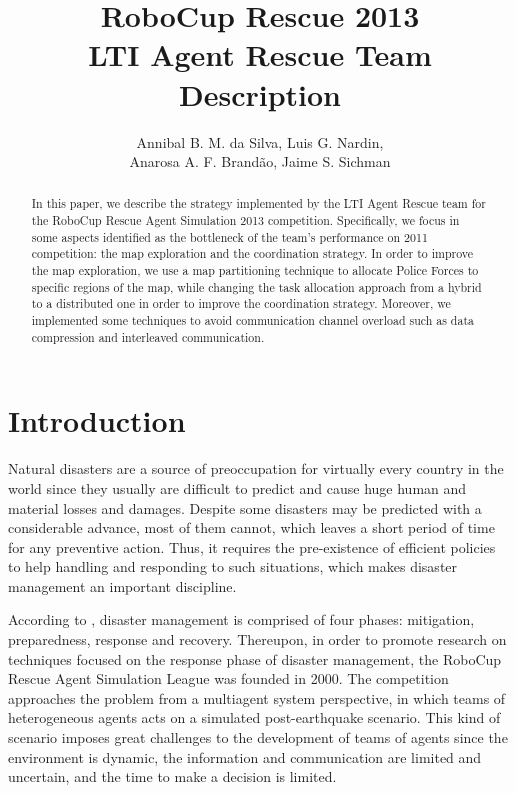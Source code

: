 \documentclass{llncs}
\begin{document}
\title{RoboCup Rescue 2013\\
       LTI Agent Rescue Team Description}
\author{Annibal B. M. da Silva, Luis G. Nardin,\\
        Anarosa A. F. Brand{\~a}o, Jaime S. Sichman}
\maketitle
\begin{abstract}
In this paper, we describe the strategy implemented by the LTI Agent Rescue team for the RoboCup Rescue Agent Simulation 2013 competition. Specifically, we focus in some aspects identified as the bottleneck of the team's performance on 2011 competition: the map exploration and the coordination strategy. In order to improve the map exploration, we use a map partitioning technique to allocate Police Forces to specific regions of the map, while changing the task allocation approach from a hybrid to a distributed one in order to improve the coordination strategy. Moreover, we implemented some techniques to avoid communication channel overload such as data compression and interleaved communication.
\end{abstract}
\section{Introduction}
\label{sec:introduction}
Natural disasters are a source of preoccupation for virtually every country in the world since they usually are difficult to predict and cause huge human and material losses and damages. Despite some disasters may be predicted with a considerable advance, most of them cannot, which leaves a short period of time for any preventive action. Thus, it requires the pre-existence of efficient policies to help handling and responding to such situations, which makes disaster management an important discipline. 

According to \cite{blanchardEtAl2007}, disaster management is comprised of four phases: mitigation, preparedness, response and recovery. Thereupon, in order to promote research on techniques focused on the response phase of disaster management, the RoboCup Rescue Agent Simulation League \cite{kitanoEtAl1999} was founded in 2000. The competition approaches the problem from a multiagent system perspective, in which teams of heterogeneous agents acts on a simulated post-earthquake scenario. This kind of scenario imposes great challenges to the development of teams of agents since the environment is dynamic, the information and communication are limited and uncertain, and the time to make a decision is limited.
\end{document}
